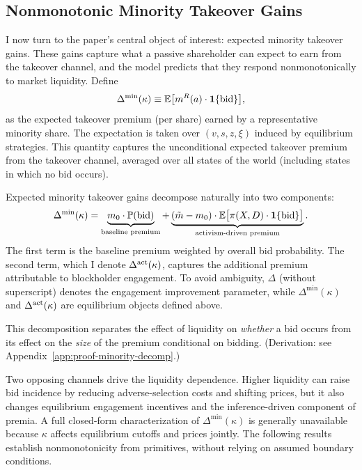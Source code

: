 \documentclass[11pt]{article}
\newcommand{\E}{\mathbb{E}}
\newcommand{\PP}{\mathbb{P}}
\newcommand{\1}{\mathbf{1}}
\begin{document}
%
\subsection{Nonmonotonic Minority Takeover Gains}
%

I now turn to the paper's central object of interest: expected minority takeover gains. These gains capture what a passive shareholder can expect to earn from the takeover channel, and the model predicts that they respond nonmonotonically to market liquidity. Define
\begin{equation}
\Delta^{\min}(\kappa) \equiv \E\big[m^{R}(a) \cdot \1\{\textup{bid}\}\big],
\label{eq:minority}
\end{equation}
as the expected takeover premium (per share) earned by a representative minority share. The expectation is taken over $(v,s,z,\xi)$ induced by equilibrium strategies. This quantity captures the unconditional expected takeover premium from the takeover channel, averaged over all states of the world (including states in which no bid occurs).

Expected minority takeover gains decompose naturally into two components:
\begin{equation}
\Delta^{\min}(\kappa) = \underbrace{m_0 \cdot \PP(\textup{bid})}_{\text{baseline premium}} + \underbrace{(\tilde{m}-m_0)\cdot \E\big[\pi(X,D)\cdot \1\{\textup{bid}\}\big]}_{\text{activism-driven premium}}.
\label{eq:decomp}
\end{equation}
The first term is the baseline premium weighted by overall bid probability. The second term, which I denote $\Delta^{\textup{act}}(\kappa)$, captures the additional premium attributable to blockholder engagement. To avoid ambiguity, $\Delta$ (without superscript) denotes the engagement improvement parameter, while $\Delta^{\min}(\kappa)$ and $\Delta^{\textup{act}}(\kappa)$ are equilibrium objects defined above.

This decomposition separates the effect of liquidity on \emph{whether} a bid occurs from its effect on the \emph{size} of the premium conditional on bidding. (Derivation: see Appendix~\ref{app:proof-minority-decomp}.)

Two opposing channels drive the liquidity dependence. Higher liquidity can raise bid incidence by reducing adverse-selection costs and shifting prices, but it also changes equilibrium engagement incentives and the inference-driven component of premia. A full closed-form characterization of $\Delta^{\min}(\kappa)$ is generally unavailable because $\kappa$ affects equilibrium cutoffs and prices jointly. The following results establish nonmonotonicity from primitives, without relying on assumed boundary conditions.
\end{document}
